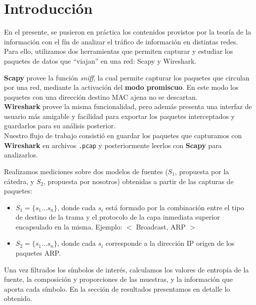 
\section{Introducción} %
En el presente, se pusieron en práctica los contenidos provistos por la teoría de la información con el fín de analizar el tráfico de información en distintas redes. Para ello, utilizamos dos herramientas que permiten capturar y estudiar los paquetes de datos que ``viajan'' en una red: Scapy y Wireshark.

{\bf Scapy} provee la función \emph{sniff}, la cual permite capturar los paquetes que circulan por una red, mediante la activación del {\bf modo  promiscuo}. En este modo los paquetes con una dirección destino  MAC ajena no se descartan. \\
{\bf Wireshark} provee la misma funcionalidad, pero además presenta una interfaz de usuario más amigable y facilidad para exportar los paquetes interceptados y guardarlos para su análisis posterior.\\
Nuestro flujo de trabajo consistió en guardar los paquetes que capturamos con {\bf Wireshark} en archivos \texttt{.pcap} y posteriormente leerlos con {\bf Scapy} para analizarlos.

Realizamos mediciones sobre dos modelos de fuentes ($S_{1}$, propuesta por la cátedra, y $S_{2}$, propuesta por nosotros) obtenidas a partir de las capturas de paquetes:
\begin{itemize}

    \item $S_{1} = \{s_{1} \dots s_{n}\}$, donde cada $s_{i}$ está formado por la combinación entre el tipo de destino de la trama y el protocolo de la capa inmediata superior encapsulado en la misma. Ejemplo: $<$ Broadcast, ARP $>$
    
    \item $S_{2} = \{s_{1} \dots s_{n}\}$, donde cada $s_{i}$ corresponde a la dirección IP origen de los paquetes ARP.
    
\end{itemize}

Una vez filtrados los símbolos de interés, calculamos los valores de entropía de la fuente, la composición y proporciones de las muestras, y la información que aporta cada símbolo. En la sección de resultados presentamos en detalle lo obtenido.